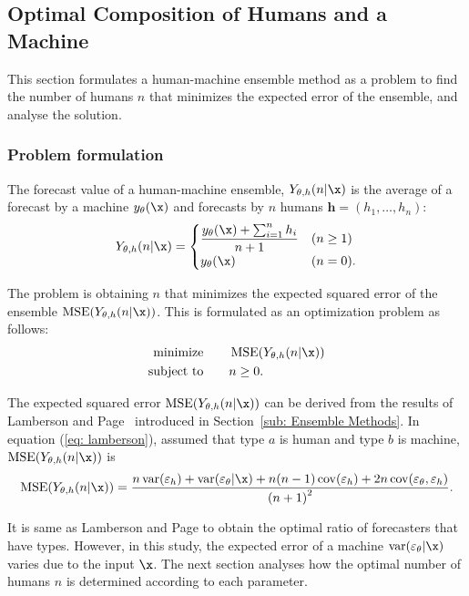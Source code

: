 \documentclass[../main.tex]{subfiles}
\begin{document}
\subsection{Optimal Composition of Humans and a Machine}
\label{sub: Optimal Composition of Humans and a Machine}

This section formulates a human-machine ensemble method as a problem to find the number of humans $n$ that minimizes the expected error of the ensemble, and analyse the solution.

\subsubsection{Problem formulation}

The forecast value of a human-machine ensemble, $Y_{\theta,h}(n|\x)$ is the average of a forecast by a machine $y_\theta(\x)$ and forecasts by $n$ humans $\bm{h} = (h_1,\ldots,h_n)$:
\begin{equation}
  Y_{\theta,h}(n|\x) =
    \begin{cases}
      \dfrac{y_\theta(\x) + \sum_{i=1}^n h_i}{n + 1} & (n \geq 1) \\
      y_\theta(\x) & (n = 0).
    \end{cases}
\end{equation}

The problem is obtaining $n$ that minimizes the expected squared error of the ensemble $\MSE(Y_{\theta,h}(n|\x))$.
This is formulated as an optimization problem as follows:
\begin{align}
  \begin{split}
    \text{minimize}   & \qquad \MSE(Y_{\theta,h}(n|\x)) \\
    \text{subject to} & \qquad n \geq 0.
    \label{eq: problem}
  \end{split}
\end{align}

The expected squared error $\MSE(Y_{\theta,h}(n|\x))$ can be derived from the results of Lamberson and Page~\cite{Lamberson2012} introduced in Section~\ref{sub: Ensemble Methods}.
In equation (\ref{eq: lamberson}), assumed that type $a$ is human and type $b$ is machine, $\MSE(Y_{\theta,h}(n|\x))$ is
\begin{equation}
  \MSE(Y_{\theta,h}(n|\x))
    = \frac{n\varh + \varm + n(n - 1)\covh + 2n\covmh}{{(n + 1)}^2}.
  \label{eq: expected squared error}
\end{equation}

It is same as Lamberson and Page to obtain the optimal ratio of forecasters that have types.
However, in this study, the expected error of a machine $\varm$ varies due to the input $\x$.
The next section analyses how the optimal number of humans $n$ is determined according to each parameter.
\end{document}
